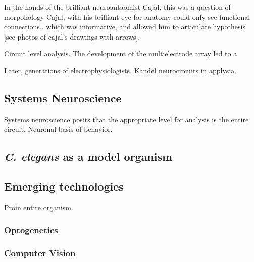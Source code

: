 In the hands of the brilliant neuroantaomist Cajal, this was a question  of morpohology
Cajal,   with his brilliant eye for anatomy could only see functional connections.. which was informative, and allowed him to articulate hypothesis [see photos of cajal's drawings with arrows]. 



Circuit level analysis.
The development of the multielectrode array \citep{meister_synchronous_1991} \citep{litke_retinal_1991}  led to a 

Later,  generations of electrophysiologists. 
Kandel neurocircuits in applysia.


\subsection{Systems Neuroscience}

Systems neuroscience posits that the appropriate level for analysis is the entire circuit. 
Neuronal basis of behavior. 

\subsection{\textit{C. elegans} as a model organism}


\subsection{Emerging technologies}
Proin entire organism. 

\subsubsection{Optogenetics}
\subsubsection{Computer Vision}



